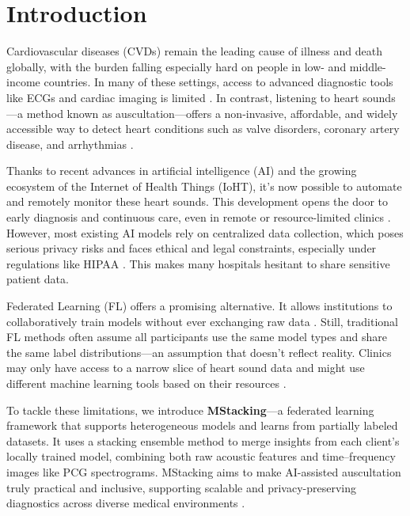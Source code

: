 \chapter{Introduction}

Cardiovascular diseases (CVDs) remain the leading cause of illness and death globally, with the burden falling especially hard on people in low- and middle-income countries. In many of these settings, access to advanced diagnostic tools like ECGs and cardiac imaging is limited \cite{roth2020global}. In contrast, listening to heart sounds—a method known as auscultation—offers a non-invasive, affordable, and widely accessible way to detect heart conditions such as valve disorders, coronary artery disease, and arrhythmias \cite{li2020review, roy2019heart}.

Thanks to recent advances in artificial intelligence (AI) and the growing ecosystem of the Internet of Health Things (IoHT), it’s now possible to automate and remotely monitor these heart sounds. This development opens the door to early diagnosis and continuous care, even in remote or resource-limited clinics \cite{winther2021advanced, qian2019deep}. However, most existing AI models rely on centralized data collection, which poses serious privacy risks and faces ethical and legal constraints, especially under regulations like HIPAA \cite{swarup2018digital}. This makes many hospitals hesitant to share sensitive patient data.

Federated Learning (FL) offers a promising alternative. It allows institutions to collaboratively train models without ever exchanging raw data \cite{xu2021federated}. Still, traditional FL methods often assume all participants use the same model types and share the same label distributions—an assumption that doesn’t reflect reality. Clinics may only have access to a narrow slice of heart sound data and might use different machine learning tools based on their resources \cite{qian2021artificial,qian2021can}.

To tackle these limitations, we introduce \textbf{MStacking}—a federated learning framework that supports heterogeneous models and learns from partially labeled datasets. It uses a stacking ensemble method to merge insights from each client’s locally trained model, combining both raw acoustic features and time–frequency images like PCG spectrograms. MStacking aims to make AI-assisted auscultation truly practical and inclusive, supporting scalable and privacy-preserving diagnostics across diverse medical environments \cite{xu2021federated}.

